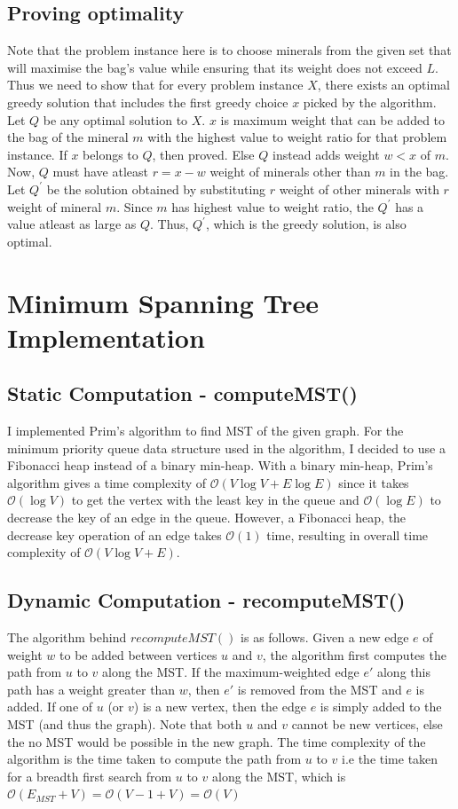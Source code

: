 \documentclass[a4paper]{article}
\begin{document}
\subsection*{Proving optimality}
Note that the problem instance here is to choose minerals from the given set that will maximise the bag's value while ensuring that its weight does not exceed $L$. Thus we need to show that for every problem instance $X$, there exists an optimal greedy solution that includes the first greedy choice $x$ picked by the algorithm. Let $Q$ be any optimal solution to $X$. $x$ is maximum weight that can be added to the bag of the mineral $m$ with the highest value to weight ratio for that problem instance. If $x$ belongs to $Q$, then proved. Else $Q$ instead adds weight $w<x$ of $m$. Now, $Q$ must have atleast $r = x-w$ weight of minerals other than $m$ in the bag. Let $Q^{'}$ be the solution obtained by substituting $r$ weight of other minerals with $r$ weight of mineral $m$. Since $m$ has highest value to weight ratio, the $Q^{'}$ has a value atleast as large as $Q$. Thus, $Q^{'}$, which is the greedy solution, is also optimal.


\section{Minimum Spanning Tree Implementation}
\subsection*{Static Computation - computeMST()}
I implemented Prim's algorithm to find MST of the given graph. For the minimum priority queue data structure used in the algorithm, I decided to use a Fibonacci heap \cite{fibo} instead of a binary min-heap. With a binary min-heap, Prim's algorithm gives a time complexity of $\mathcal{O}(V\log V + E\log E)$ since it takes $\mathcal{O}(\log V)$ to get the vertex with the least key in the queue and $\mathcal{O}(\log E)$ to decrease the key of an edge in the queue. However, a Fibonacci heap, the decrease key operation of an edge takes $\mathcal{O}(1)$ time, resulting in overall time complexity of $\mathcal{O}(V\log V + E)$.
\subsection*{Dynamic Computation - recomputeMST()}
The algorithm behind $recomputeMST()$ is as follows. Given a new edge $e$ of weight $w$ to be added between vertices $u$ and $v$, the algorithm first computes the path from $u$ to $v$ along the MST. If the maximum-weighted edge $e'$ along this path has a weight greater than $w$, then $e'$ is removed from the MST and $e$ is added. If one of $u$ (or $v$) is a new vertex, then the edge $e$ is simply added to the MST (and thus the graph). Note that both $u$ and $v$ cannot be new vertices, else the no MST would be possible in the new graph. The time complexity of the algorithm is the time taken to compute the path from $u$ to $v$ i.e the time taken for a breadth first search from $u$ to $v$ along the MST, which is $\mathcal{O}(E_{MST} + V) = \mathcal{O}(V-1 + V) = \mathcal{O}(V)$
\end{document}
